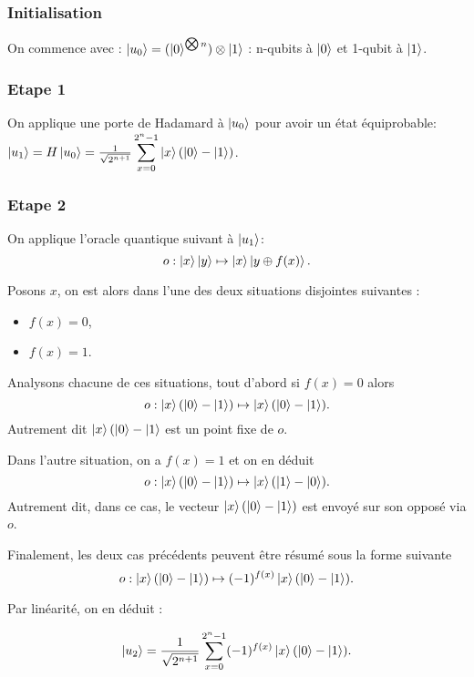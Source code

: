 \subsubsection{Initialisation}
On commence avec :
$\ket{u_0} = (\ket{0}^{\bigotimes n}) \otimes \ket{1}$
: n-qubits à $\ket{0}$ et 1-qubit à $\ket{1}$.

\subsubsection{Etape 1}

On applique une porte de Hadamard à $\ket{u_0}$ pour avoir un état équiprobable:
$\ket{u_1} = H\ket{u_0} = \frac{1}{\sqrt{2^{n + 1}}}
\displaystyle\sum_{x=0}^{2^n-1} \ket{x}(\ket{0} - \ket{1})$.

\subsubsection{Etape 2}
On applique l'oracle quantique suivant à $\ket{u_1}$:
\[ o : \ket{x}\ket{y}\mapsto \ket{x}\ket{y\oplus f(x)}. \]

Posons $x$, on est alors dans l'une des deux situations disjointes suivantes :
\begin{itemize}
\item $f(x) = 0$,
\item $f(x) = 1$.
\end{itemize}

Analysons chacune de ces situations, tout d'abord si $f(x) = 0$ alors
\[
o : \ket{x}(\ket{0} - \ket{1}) \mapsto \ket{x}(\ket{0} - \ket{1}).
\]
Autrement dit $\ket{x}(\ket{0} - \ket{1}$ est un  point fixe de $o$.

Dans l'autre situation, on a $f(x) = 1$ et on en déduit
\[
o : \ket{x}(\ket{0} - \ket{1}) \mapsto \ket{x}(\ket{1} - \ket{0}).
\]
Autrement dit, dans ce cas, le vecteur $\ket{x}(\ket{0} - \ket{1})$
est envoyé sur son opposé via $o$.

Finalement, les deux cas précédents peuvent être résumé sous la forme suivante
\[
o : \ket{x}(\ket{0} - \ket{1}) \mapsto (-1)^{f(x)}\ket{x}(\ket{0} - \ket{1}).
\]

Par linéarité, on en déduit :

\begin{equation}\ket{u_2} = \frac{1}{\sqrt{2^{n + 1}}} 
\displaystyle\sum_{x=0}^{2^n-1} (-1)^{f(x)}\ket{x}(\ket{0} - \ket{1}) .
\end{equation}

